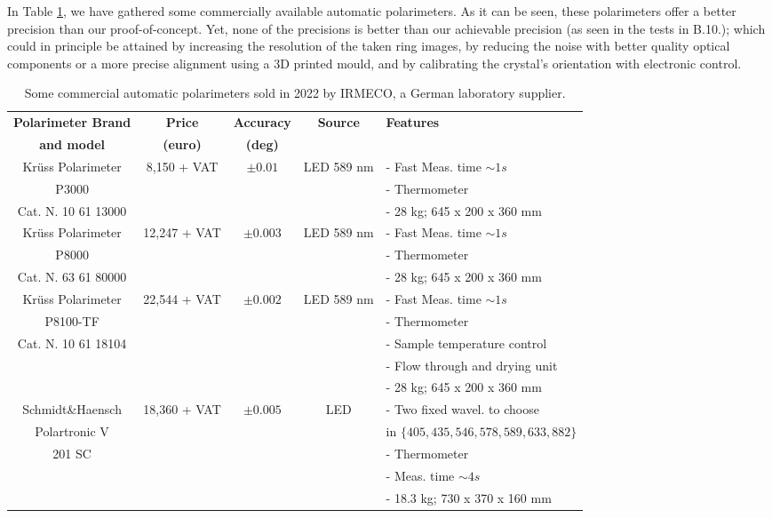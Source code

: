 \documentclass[11pt, a4paper, twoside]{article} %
\begin{document}
In Table \ref{tab:commercial}, we have gathered some commercially available automatic polarimeters. As it can be seen, these polarimeters offer a better precision than our proof-of-concept. Yet, none of the precisions is better than our achievable precision (as seen in the tests in B.10.); which could in principle be attained by increasing the resolution of the taken ring images, by reducing the noise with better quality optical components or a more precise alignment using a 3D printed mould, and by calibrating the crystal's orientation with electronic control.\vspace{0.1cm}
\begin{table}[h!]
\caption{Some commercial automatic polarimeters sold in 2022 by IRMECO, a German laboratory supplier. }
\centering
\label{tab:commercial}
\hspace*{-0.4cm}\begin{tabular}{c|c|c|c|l}
\toprule
{\bf Polarimeter Brand} & {\bf Price } & {\bf Accuracy} & {\bf Source} &{\bf 	Features}\\
{\bf and model} & {\bf (euro)} & {\bf (deg)} & \\

\midrule
Krüss Polarimeter & 8,150 {\footnotesize + VAT} & $\pm 0.01$ & LED 589 nm & - Fast Meas. time $\sim 1s$\\
P3000  & & & & - Thermometer\\ Cat. N. 10 61 13000 & & & & - 28 kg; 645 x 200 x 360 mm\\ \hline\rule{0pt}{4mm}{}
Krüss Polarimeter & 12,247 {\footnotesize + VAT} & $\pm 0.003$ & LED 589 nm & - Fast Meas. time $\sim 1s$\\
P8000 & & & & - Thermometer \\ Cat. N. 63 61 80000 & & & & - 28 kg; 645 x 200 x 360 mm\\ \hline\rule{0pt}{4mm}{}
Krüss Polarimeter & 22,544 {\footnotesize + VAT} & $\pm 0.002$ & LED 589 nm & - Fast Meas. time $\sim 1s$\\
P8100-TF  & & & & - Thermometer \\
Cat. N. 10 61 18104 & & & & - Sample temperature control\\
& & & & - Flow through and drying unit \\ & & & & - 28 kg; 645 x 200 x 360 mm\\ \hline\rule{0pt}{4mm}{}
 Schmidt\&Haensch & 18,360 {\footnotesize + VAT} & $\pm 0.005$ & LED & - Two fixed wavel. to choose\\
  Polartronic V& & & & in {\small $\{405, 435, 546, 578, 589, 633, 882\}$}\\
  201 SC & & & & - Thermometer\\
    & & & & - Meas. time $\sim 4s$ \\
    & & & & - 18.3 kg; 730 x 370 x 160 mm \\

 \bottomrule
\end{tabular}

\end{table}
\end{document}
